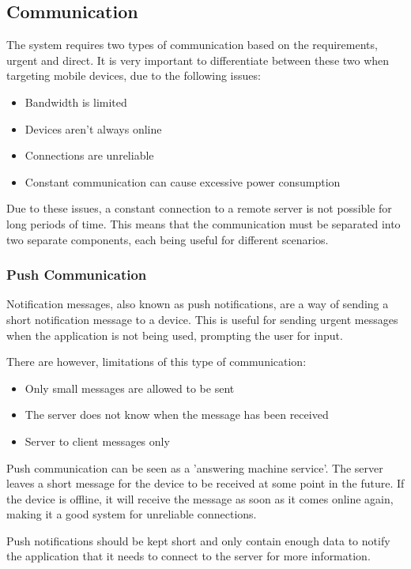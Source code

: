 \subsection{Communication}

The system requires two types of communication based on the requirements, urgent and direct. It is very important to differentiate between these two when targeting mobile devices, due to the following issues:
\begin{itemize}
	\item Bandwidth is limited
	\item Devices aren't always online
	\item Connections are unreliable
	\item Constant communication can cause excessive power consumption
\end{itemize}

Due to these issues, a constant connection to a remote server is not possible for long periods of time. This means that the communication must be separated into two separate components, each being useful for different scenarios.

\subsubsection{Push Communication}

Notification messages, also known as push notifications, are a way of sending a short notification message to a device. This is useful for sending urgent messages when the application is not being used, prompting the user for input.

There are however, limitations of this type of communication:

\begin{itemize}
	\item Only small messages are allowed to be sent
	\item The server does not know when the message has been received
	\item Server to client messages only
\end{itemize}

Push communication can be seen as a 'answering machine service'. The server leaves a short message for the device to be received at some point in the future. If the device is offline, it will receive the message as soon as it comes online again, making it a good system for unreliable connections.

Push notifications should be kept short and only contain enough data to notify the application that it needs to connect to the server for more information.

